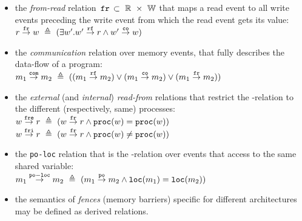 \begin{itemize}

    \item the \textit{from-read} relation $\,\mathtt{fr}\, \subset~\mathbb{R}~\times~\mathbb{W}$ that maps a read event to all write events preceding the write event from which the read event gets its value: \\
    $r \overset{\mathtt{fr}}{\rightarrow} w ~\triangleq~ (\exists w' . w' \overset{\mathtt{rf}}{\rightarrow} r \land w' \overset{\mathtt{co}}{\rightarrow} w)$


    \item the \textit{communication} relation \com over memory events, that fully describes the data-flow of a program: \\
    $m_1 \overset{\mathtt{com}}{\rightarrow} m_2~\triangleq~((m_1\overset{\mathtt{rf}}{\rightarrow}m_2) \lor (m_1\overset{\mathtt{co}}{\rightarrow}m_2) \lor (m_1\overset{\mathtt{fr}}{\rightarrow}m_2))$

    \item the \textit{external} (and \textit{internal}) \textit{read-from} relations that restrict the \rf-relation to the different (respectively, same) processes: \\
    $w \overset{\mathtt{fre}}{\rightarrow} r ~\triangleq~ (w \overset{\mathtt{fr}}{\rightarrow} r \land \mathtt{proc}(w) = \mathtt{proc}(w))$ \\
    $w \overset{\mathtt{fri}}{\rightarrow} r ~\triangleq~ (w \overset{\mathtt{fr}}{\rightarrow} r \land \mathtt{proc}(w) \neq \mathtt{proc}(w))$
    
    \item the \texttt{po-loc} relation that is the \po-relation over events that access to the same shared variable: \\
    $m_1 \overset{\mathtt{po-loc}}{\rightarrow} m_2 ~\triangleq~ (m_1 \overset{\mathtt{po}}{\rightarrow} m_2 \land \mathtt{loc}(m_1) = \mathtt{loc}(m_2))$

    \item the semantics of \textit{fences} (memory barriers) specific for different architectures may be defined as derived relations.


\end{itemize}

